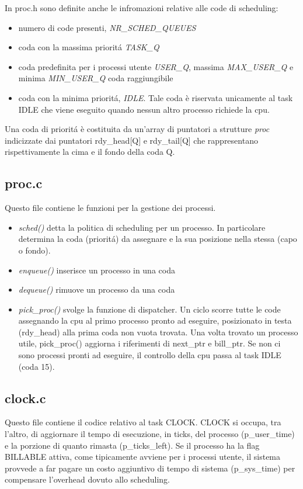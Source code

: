 \documentclass[a4paper,12pt]{report}
\begin{document}
In proc.h sono definite anche le infromazioni relative alle code di scheduling:
\begin{itemize}
 \item numero di code presenti, \textit{NR\_SCHED\_QUEUES}
 \item coda con la massima priorit\'a \textit{TASK\_Q}
 \item coda predefinita per i processi utente \textit{USER\_Q}, massima
 \textit{MAX\_USER\_Q} e minima \textit{MIN\_USER\_Q} coda raggiungibile 
 \item coda con la minima priorit\'a, \textit{IDLE}. Tale coda \`e riservata
 unicamente al task IDLE che viene eseguito quando nessun altro processo richiede la cpu. 
\end{itemize}

Una coda di priorit\'a \`e costituita da un'array di puntatori a strutture
\textit{proc} indicizzate
dai puntatori rdy\_head[Q] e rdy\_tail[Q] che rappresentano rispettivamente la cima e il fondo
della coda Q.

\subsection{proc.c}
Questo file contiene le funzioni per la gestione dei processi.
\begin{itemize}
 \item \textit{sched()} detta la politica di scheduling per un processo. In particolare determina la coda (priorit\'a) da assegnare e la sua posizione nella stessa (capo o fondo).
 \item \textit{enqueue()} inserisce un processo in una coda
 \item \textit{dequeue()} rimuove un processo da una coda
 \item \textit{pick\_proc()} svolge la funzione di dispatcher. Un ciclo
 scorre tutte le code assegnando la cpu al primo processo pronto ad
 eseguire, posizionato in testa (rdy\_head) alla prima coda non vuota
 trovata. Una volta trovato un processo utile, pick\_proc() aggiorna i
 riferimenti di next\_ptr e bill\_ptr. Se non ci sono processi pronti ad
 eseguire, il controllo della cpu passa al task IDLE (coda 15).
\end{itemize}

\subsection{clock.c}
Questo file contiene il codice relativo al task CLOCK.
CLOCK si occupa, tra l'altro, di aggiornare il tempo di esecuzione, in
ticks, del processo (p\_user\_time) e la porzione di quanto rimasta 
(p\_ticks\_left).
Se il processo ha la flag BILLABLE attiva, come tipicamente avviene per i
processi utente, il sistema provvede a far pagare un costo aggiuntivo
di tempo di sistema (p\_sys\_time) per compensare l'overhead dovuto allo scheduling.
\end{document}
